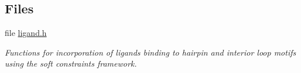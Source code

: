 \subsection*{Files}
\begin{DoxyCompactItemize}
\item 
file \hyperlink{ligand_8h}{ligand.\+h}
\begin{DoxyCompactList}\small\item\em Functions for incorporation of ligands binding to hairpin and interior loop motifs using the soft constraints framework. \end{DoxyCompactList}\end{DoxyCompactItemize}
